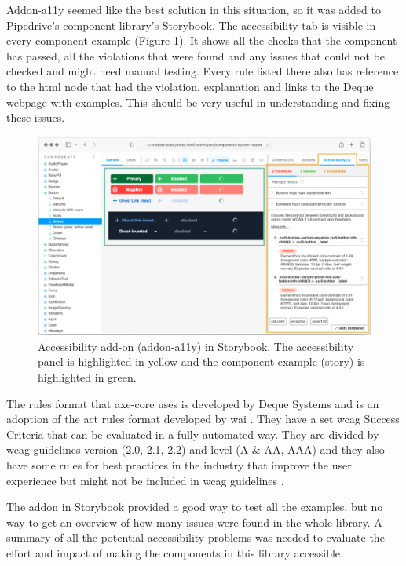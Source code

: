 \documentclass{master_thesis}
\begin{document}
Addon-a11y seemed like the best solution in this situation, so it was added to Pipedrive's component library’s Storybook. The accessibility tab is visible in every component example (Figure \ref{fig:addon-a11y}). It shows all the checks that the component has passed, all the violations that were found and any issues that could not be checked and might need manual testing. Every rule listed there also has reference to the \ac{html} node that had the violation, explanation and links to the Deque webpage with examples. This should be very useful in understanding and fixing these issues.

\begin{figure}[h]
	\includegraphics[width=\textwidth]{img/addon-a11y.png}
	\caption[Accessibility add-on (addon-a11y) in Storybook.]{Accessibility add-on (addon-a11y) in Storybook. The accessibility panel is highlighted in yellow and the component example (story) is highlighted in green.}
	\label{fig:addon-a11y}
\end{figure}

The rules format that axe-core uses is developed by Deque Systems and is an adoption of the \ac{act} rules format developed by \ac{wai} \citep{Fiers2017}. They have a set \ac{wcag} Success Criteria that can be evaluated in a fully automated way. They are divided by \ac{wcag} guidelines version (2.0, 2.1, 2.2) and level (A \& AA, AAA) and they also have some rules for best practices in the industry that improve the user experience but might not be included in \ac{wcag} guidelines \citep{Fiers2023}.

The addon in Storybook provided a good way to test all the examples, but no way to get an overview of how many issues were found in the whole library. A summary of all the potential accessibility problems was needed to evaluate the effort and impact of making the components in this library accessible.
\end{document}
